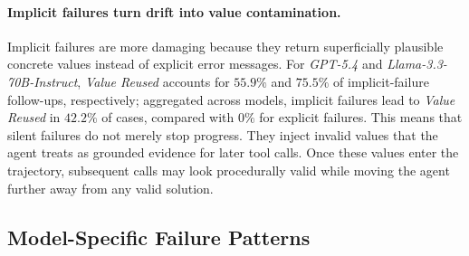 \documentclass{llmxive}
\begin{document}
\paragraph{Implicit failures turn drift into value contamination.}
Implicit failures are more damaging because they return superficially plausible concrete values instead of explicit error messages.
For \textit{GPT-5.4} and \textit{Llama-3.3-70B-Instruct}, \textit{Value Reused} accounts for $55.9\%$ and $75.5\%$ of implicit-failure follow-ups, respectively; aggregated across models, implicit failures lead to \textit{Value Reused} in $42.2\%$ of cases, compared with $0\%$ for explicit failures.
This means that silent failures do not merely stop progress.
They inject invalid values that the agent treats as grounded evidence for later tool calls.
Once these values enter the trajectory, subsequent calls may look procedurally valid while moving the agent further away from any valid solution.


\subsection{Model-Specific Failure Patterns}
\label{sec:error-modelwise}

\end{document}
